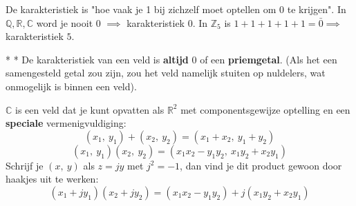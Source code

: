 \textbf{} De karakteristiek is "hoe vaak je 1 bij zichzelf moet optellen om 0 te krijgen". In $\mathbb{Q},\mathbb{R},\mathbb{C}$ word je nooit 0 $\implies$ karakteristiek 0. In $\mathbb{Z}_5$ is $1+1+1+1+1=\bar{0} \implies$ karakteristiek $5$.

\begin{nicecorollary}*
    \nextpart[]*
    De karakteristiek van een veld is \textbf{altijd} $0$ of een \textbf{priemgetal}. (Als het een samengesteld getal zou zijn, zou het veld namelijk stuiten op nuldelers, wat onmogelijk is binnen een veld).
\end{nicecorollary}

\textbf{}\newline
$\mathbb{C}$ is een veld dat je kunt opvatten als $\mathbb{R}^2$ met componentsgewijze optelling en een \textbf{speciale} vermenigvuldiging:
\begin{equation*}
    (x_1,\ y_1) + (x_2,\ y_2) = (x_1 + x_2,\ y_1 + y_2)
\end{equation*}
\begin{equation*}
    (x_1,\ y_1)(x_2,\ y_2) = (x_1x_2 - y_1y_2,\ x_1y_2 + x_2y_1)
\end{equation*}
Schrijf je $(x,\ y)$ als $z = jy$ met $j^2 = -1$, dan vind je dit product gewoon door haakjes uit te werken:
\begin{equation*}
    (x_1 + jy_1)(x_2 + jy_2) = (x_1x_2 - y_1y_2) + j(x_1y_2 + x_2y_1)
\end{equation*}

